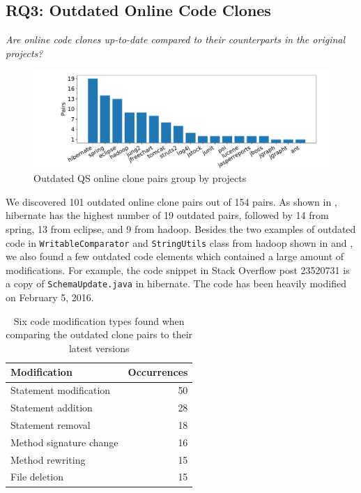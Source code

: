 \documentclass[10pt,journal,compsoc]{IEEEtran}
\begin{document}
\subsection{RQ3: Outdated Online Code Clones}
\vspace{0.25cm}
\textit{Are online code clones up-to-date compared to their counterparts in the original projects?}
\vspace{0.25cm}

\begin{figure}
	\centering
	\includegraphics[width=0.8\linewidth]{outdated}
	\caption{Outdated QS online clone pairs group by projects}
	\label{fig:outdated}
\end{figure}

We discovered 101 outdated online clone pairs out of 154 pairs. As shown in
, \textsf{hibernate} has the highest number of 19 outdated
pairs, followed by 14 from \textsf{spring}, 13 from \textsf{eclipse}, and 9 from
\textsf{hadoop}. Besides the two examples of outdated code in %
{\small{\texttt{WritableComparator}}} and
{\small{\texttt{StringUtils}}} class from \textsf{hadoop} shown in
 and , we also found a few
outdated code elements which contained a large amount of modifications. For
example, the code snippet in Stack Overflow post 23520731 is a copy of
{\small{\texttt{SchemaUpdate.java}}} in \textsf{hibernate}. The code has been
heavily modified on February 5, 2016.


\begin{table}
	\centering
	\caption{Six code modification types found when comparing the outdated clone pairs to their latest versions}
	\label{tab:mod_types}
		\begin{tabular}{lr}
			\toprule
			Modification & Occurrences \\
			\midrule
			Statement modification & 50 \\
			Statement addition & 28 \\
			Statement removal & 18 \\
			Method signature change & 16 \\
			Method rewriting & 15 \\
			File deletion & 15 \\
			\bottomrule 
		\end{tabular}
\end{table}
\end{document}
